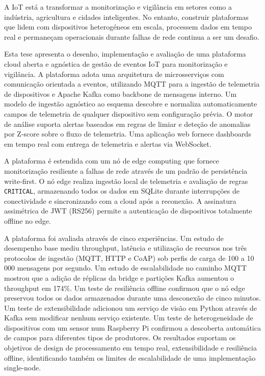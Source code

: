 
%

A \gls{IoT} est\'{a} a transformar a monitoriza\c{c}\~{a}o e vigil\^{a}ncia em setores como a ind\'{u}stria, agricultura e cidades inteligentes. No entanto, construir plataformas que lidem com dispositivos heterog\'{e}neos em escala, processem dados em tempo real e permane\c{c}am operacionais durante falhas de rede continua a ser um desafio.

Esta tese apresenta o desenho, implementa\c{c}\~{a}o e avalia\c{c}\~{a}o de uma plataforma cloud aberta e agn\'{o}stica de gest\~{a}o de eventos \gls{IoT} para monitoriza\c{c}\~{a}o e vigil\^{a}ncia. A plataforma adota uma arquitetura de microsservi\c{c}os com comunica\c{c}\~{a}o orientada a eventos, utilizando \gls{MQTT} para a ingest\~{a}o de telemetria de dispositivos e Apache Kafka como backbone de mensagens interno. Um modelo de ingest\~{a}o agn\'{o}stico ao esquema descobre e normaliza automaticamente campos de telemetria de qualquer dispositivo sem configura\c{c}\~{a}o pr\'{e}via. O motor de an\'{a}lise suporta alertas baseados em regras de limiar e dete\c{c}\~{a}o de anomalias por Z-score sobre o fluxo de telemetria. Uma aplica\c{c}\~{a}o web fornece dashboards em tempo real com entrega de telemetria e alertas via WebSocket.

A plataforma \'{e} estendida com um n\'{o} de edge computing que fornece monitoriza\c{c}\~{a}o resiliente a falhas de rede atrav\'{e}s de um padr\~{a}o de persist\^{e}ncia write-first. O n\'{o} edge realiza ingest\~{a}o local de telemetria e avalia\c{c}\~{a}o de regras \texttt{CRITICAL}, armazenando todos os dados em SQLite durante interrup\c{c}\~{o}es de conectividade e sincronizando com a cloud ap\'{o}s a reconex\~{a}o. A assinatura assim\'{e}trica de \gls{JWT} (RS256) permite a autentica\c{c}\~{a}o de dispositivos totalmente offline no edge.

A plataforma foi avaliada atrav\'{e}s de cinco experi\^{e}ncias. Um estudo de desempenho base mediu throughput, lat\^{e}ncia e utiliza\c{c}\~{a}o de recursos nos tr\^{e}s protocolos de ingest\~{a}o (\gls{MQTT}, \gls{HTTP} e \gls{CoAP}) sob perfis de carga de 100 a 10\,000 mensagens por segundo. Um estudo de escalabilidade no caminho \gls{MQTT} mostrou que a adi\c{c}\~{a}o de r\'{e}plicas da bridge e parti\c{c}\~{o}es Kafka aumentou o throughput em 174\%. Um teste de resili\^{e}ncia offline confirmou que o n\'{o} edge preservou todos os dados armazenados durante uma desconex\~{a}o de cinco minutos. Um teste de extensibilidade adicionou um servi\c{c}o de vis\~{a}o em Python atrav\'{e}s de Kafka sem modificar nenhum servi\c{c}o existente. Um teste de heterogeneidade de dispositivos com um sensor num Raspberry Pi confirmou a descoberta autom\'{a}tica de campos para diferentes tipos de produtores. Os resultados suportam os objetivos de design de processamento em tempo real, extensibilidade e resili\^{e}ncia offline, identificando tamb\'{e}m os limites de escalabilidade de uma implementa\c{c}\~{a}o single-node.

